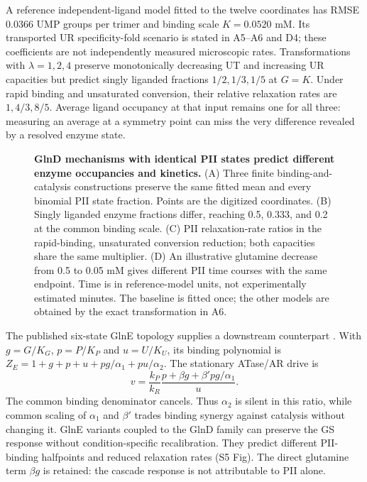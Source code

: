 \documentclass[10pt,letterpaper]{article}
\begin{document}
A reference independent-ligand model fitted to the twelve coordinates has RMSE 0.0366 UMP groups per trimer and binding scale $K=0.0520$ mM. Its transported UR specificity-fold scenario is stated in A5--A6 and D4; these coefficients are not independently measured microscopic rates. Transformations with $\lambda=1,2,4$ preserve monotonically decreasing UT and increasing UR capacities but predict singly liganded fractions $1/2,1/3,1/5$ at $G=K$. Under rapid binding and unsaturated conversion, their relative relaxation rates are $1,4/3,8/5$. Average ligand occupancy at that input remains one for all three: measuring an average at a symmetry point can miss the very difference revealed by a resolved enzyme state.

\begin{figure}[!ht]
\centering
\begin{singlespace}
\caption{\textbf{GlnD mechanisms with identical PII states predict different enzyme occupancies and kinetics.} (A) Three finite binding-and-catalysis constructions preserve the same fitted mean and every binomial PII state fraction. Points are the digitized coordinates. (B) Singly liganded enzyme fractions differ, reaching 0.5, 0.333, and 0.2 at the common binding scale. (C) PII relaxation-rate ratios in the rapid-binding, unsaturated conversion reduction; both capacities share the same multiplier. (D) An illustrative glutamine decrease from 0.5 to 0.05 mM gives different PII time courses with the same endpoint. Time is in reference-model units, not experimentally estimated minutes. The baseline is fitted once; the other models are obtained by the exact transformation in A6.}
\end{singlespace}

\end{figure}

The published six-state GlnE topology supplies a downstream counterpart \cite{r71}. With $g=G/K_G$, $p=P/K_P$ and $u=U/K_U$, its binding polynomial is $Z_E=1+g+p+u+pg/\alpha_1+pu/\alpha_2$. The stationary ATase/AR drive is
\[
 v=\frac{k_P}{k_R}\frac{p+\beta g+\beta'pg/\alpha_1}{u}.
\]
The common binding denominator cancels. Thus $\alpha_2$ is silent in this ratio, while common scaling of $\alpha_1$ and $\beta'$ trades binding synergy against catalysis without changing it. GlnE variants coupled to the GlnD family can preserve the GS response without condition-specific recalibration. They predict different PII-binding halfpoints and reduced relaxation rates (S5 Fig). The direct glutamine term $\beta g$ is retained: the cascade response is not attributable to PII alone.
\end{document}
